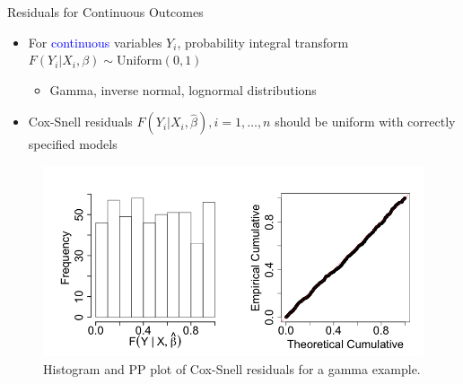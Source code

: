 \documentclass[
  ignorenonframetext,
]{beamer}
\begin{document}
\begin{frame}{Residuals for Continuous Outcomes}
\protect\hypertarget{residuals-for-continuous-outcomes}{}
\begin{itemize}
    
    \item For \textcolor{blue}{continuous} variables $Y_i$, 
probability integral transform $F(Y_i|X_i,\beta)\sim \mathrm{Uniform}(0,1)$
\begin{itemize}
\item Gamma, inverse normal, lognormal distributions
\end{itemize}
\item Cox-Snell residuals  $F(Y_i|X_i,\hat{\beta}),i=1,\ldots,n$ should be uniform with correctly specified models
\end{itemize}

\vspace{5pt}
\begin{figure}[h]
\includegraphics[width=.8\textwidth]{figures/continuous}
\caption{Histogram and PP plot of Cox-Snell  residuals for a gamma example. }
\end{figure}
\end{frame}
\end{document}

